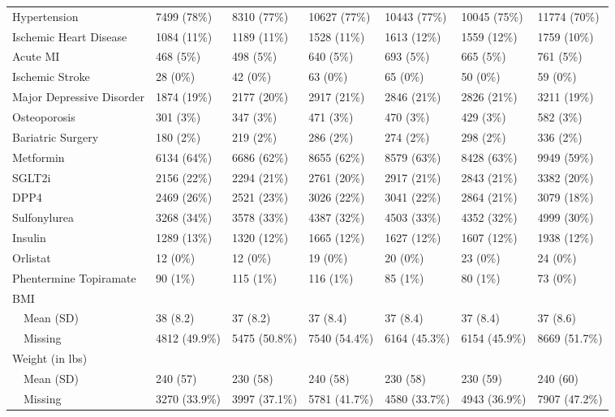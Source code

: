 \begin{longtable}{p{}p{}p{}p{}p{}p{}p{}}
  Hypertension & 7499 (78\%) & 8310 (77\%) & 10627 (77\%) & 10443 (77\%) & 10045 (75\%) & 11774 (70\%) \\ 
  Ischemic Heart Disease & 1084 (11\%) & 1189 (11\%) & 1528 (11\%) & 1613 (12\%) & 1559 (12\%) & 1759 (10\%) \\ 
  Acute MI & 468 (5\%) & 498 (5\%) & 640 (5\%) & 693 (5\%) & 665 (5\%) & 761 (5\%) \\ 
  Ischemic Stroke & 28 (0\%) & 42 (0\%) & 63 (0\%) & 65 (0\%) & 50 (0\%) & 59 (0\%) \\ 
  Major Depressive Disorder & 1874 (19\%) & 2177 (20\%) & 2917 (21\%) & 2846 (21\%) & 2826 (21\%) & 3211 (19\%) \\ 
  Osteoporosis & 301 (3\%) & 347 (3\%) & 471 (3\%) & 470 (3\%) & 429 (3\%) & 582 (3\%) \\ 
  Bariatric Surgery & 180 (2\%) & 219 (2\%) & 286 (2\%) & 274 (2\%) & 298 (2\%) & 336 (2\%) \\ 
  Metformin & 6134 (64\%) & 6686 (62\%) & 8655 (62\%) & 8579 (63\%) & 8428 (63\%) & 9949 (59\%) \\ 
  SGLT2i & 2156 (22\%) & 2294 (21\%) & 2761 (20\%) & 2917 (21\%) & 2843 (21\%) & 3382 (20\%) \\ 
  DPP4 & 2469 (26\%) & 2521 (23\%) & 3026 (22\%) & 3041 (22\%) & 2864 (21\%) & 3079 (18\%) \\ 
  Sulfonylurea & 3268 (34\%) & 3578 (33\%) & 4387 (32\%) & 4503 (33\%) & 4352 (32\%) & 4999 (30\%) \\ 
  Insulin & 1289 (13\%) & 1320 (12\%) & 1665 (12\%) & 1627 (12\%) & 1607 (12\%) & 1938 (12\%) \\ 
  Orlistat & 12 (0\%) & 12 (0\%) & 19 (0\%) & 20 (0\%) & 23 (0\%) & 24 (0\%) \\ 
  Phentermine Topiramate & 90 (1\%) & 115 (1\%) & 116 (1\%) & 85 (1\%) & 80 (1\%) & 73 (0\%) \\ 
  BMI &  &  &  &  &  &  \\ 
    Mean (SD) & 38 (8.2) & 37 (8.2) & 37 (8.4) & 37 (8.4) & 37 (8.4) & 37 (8.6) \\ 
    Missing & 4812 (49.9\%) & 5475 (50.8\%) & 7540 (54.4\%) & 6164 (45.3\%) & 6154 (45.9\%) & 8669 (51.7\%) \\ 
  Weight (in lbs) &  &  &  &  &  &  \\ 
    Mean (SD) & 240 (57) & 230 (58) & 240 (58) & 230 (58) & 230 (59) & 240 (60) \\ 
    Missing & 3270 (33.9\%) & 3997 (37.1\%) & 5781 (41.7\%) & 4580 (33.7\%) & 4943 (36.9\%) & 7907 (47.2\%) \\ 

\end{longtable}
